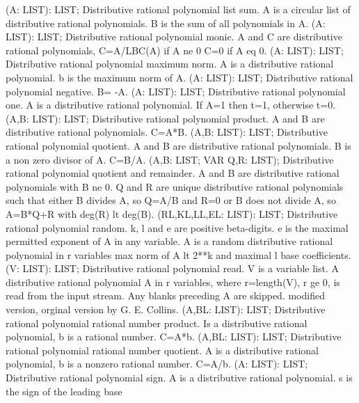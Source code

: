  (A: LIST): LIST; \eproc
\bcom Distributive rational polynomial list sum. A is a circular
list of distributive rational polynomials. B is the sum of all
polynomials in A.  \ecom 
{} (A: LIST): LIST; \eproc
\bcom Distributive rational polynomial monic. A and C are
distributive rational polynomials, C=A/LBC(A) if A ne 0
C=0 if A eq 0.  \ecom 
{} (A: LIST): LIST; \eproc
\bcom Distributive rational polynomial maximum norm. A is a
distributive rational polynomial. b is the maximum norm of A. \ecom 
{} (A: LIST): LIST; \eproc
\bcom Distributive rational polynomial negative. B= -A. \ecom 
{} (A: LIST): LIST; \eproc
\bcom Distributive rational polynomial one. A is a distributive
rational polynomial. If A=1 then t=1, otherwise t=0. \ecom 
{} (A,B: LIST): LIST; \eproc
\bcom Distributive rational polynomial product. A and B are
distributive rational polynomials. C=A*B. \ecom 
{} (A,B: LIST): LIST; \eproc
\bcom Distributive rational polynomial quotient. A and B are
distributive rational polynomials. B is a non zero divisor
of A. C=B/A. \ecom 
{} (A,B: LIST; VAR Q,R: LIST); \eproc
\bcom Distributive rational polynomial quotient and remainder.
A and B are distributive rational polynomials with B ne 0.
Q and R are unique distributive rational polynomials such
that either B divides A, so Q=A/B and R=0  or B does not
divide A, so A=B*Q+R with deg(R) lt deg(B).  \ecom 
{} (RL,KL,LL,EL: LIST): LIST; \eproc
\bcom Distributive rational polynomial random.
k, l and e are positive beta-digits. e is the
maximal permitted exponent of A in any variable. A is a
random distributive rational polynomial in r variables
max norm of A lt 2**k and maximal l base coefficients.  \ecom 
{} (V: LIST): LIST; \eproc
\bcom Distributive rational polynomial read. V is a variable list.
A distributive rational polynomial A in r variables, where
r=length(V), r ge 0, is read from the input stream. Any
blanks preceding A are skipped. modified version, orginal
version by G. E. Collins.  \ecom 
{} (A,BL: LIST): LIST; \eproc
\bcom Distributive rational polynomial rational number product.
Is a distributive rational polynomial, b is a rational number.
C=A*b. \ecom 
{} (A,BL: LIST): LIST; \eproc
\bcom Distributive rational polynomial rational number quotient. A
is a distributive rational polynomial, b is a nonzero rational
number. C=A/b. \ecom 
{} (A: LIST): LIST; \eproc
\bcom Distributive rational polynomial sign. A is a distributive
rational polynomial. s is the sign of the leading base

